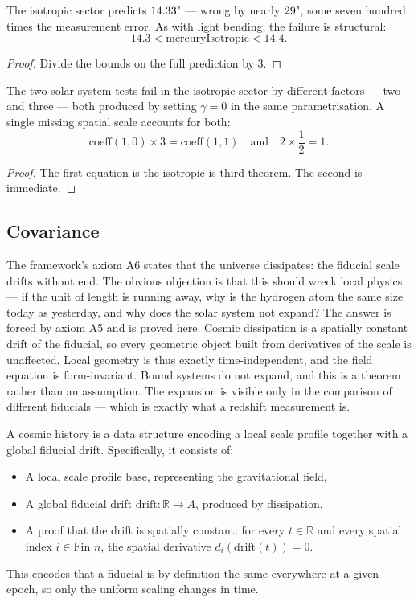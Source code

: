 \begin{theorem}
The isotropic sector predicts $14.33 \text{\textquotedbl}$ — wrong by nearly $29 \text{\textquotedbl}$, some seven hundred times the measurement error. As with light bending, the failure is structural:
\[
14.3 < \text{mercuryIsotropic} < 14.4.
\]
\begin{proof}
Divide the bounds on the full prediction by $3$.
\end{proof}
\end{theorem}

\begin{theorem}
The two solar-system tests fail in the isotropic sector by different factors — two and three — both produced by setting $\gamma = 0$ in the same parametrisation. A single missing spatial scale accounts for both:
\[
\text{coeff}(1, 0) \times 3 = \text{coeff}(1, 1) \quad \text{and} \quad 2 \times \frac{1}{2} = 1.
\]
\begin{proof}
The first equation is the isotropic-is-third theorem. The second is immediate.
\end{proof}
\end{theorem}

\subsection{Covariance}

The framework's axiom A6 states that the universe dissipates: the fiducial scale drifts without end. The obvious objection is that this should wreck local physics — if the unit of length is running away, why is the hydrogen atom the same size today as yesterday, and why does the solar system not expand? The answer is forced by axiom A5 and is proved here. Cosmic dissipation is a spatially constant drift of the fiducial, so every geometric object built from derivatives of the scale is unaffected. Local geometry is thus exactly time-independent, and the field equation is form-invariant. Bound systems do not expand, and this is a theorem rather than an assumption. The expansion is visible only in the comparison of different fiducials — which is exactly what a redshift measurement is.

\begin{definition}
A cosmic history is a data structure encoding a local scale profile together with a global fiducial drift. Specifically, it consists of:
\begin{itemize}
\item A local scale profile $\text{base}$, representing the gravitational field,
\item A global fiducial drift $\text{drift} : \mathbb{R} \to A$, produced by dissipation,
\item A proof that the drift is spatially constant: for every $t \in \mathbb{R}$ and every spatial index $i \in \text{Fin } n$, the spatial derivative $d_i(\text{drift}(t)) = 0$.
\end{itemize}
This encodes that a fiducial is by definition the same everywhere at a given epoch, so only the uniform scaling changes in time.
\end{definition}


